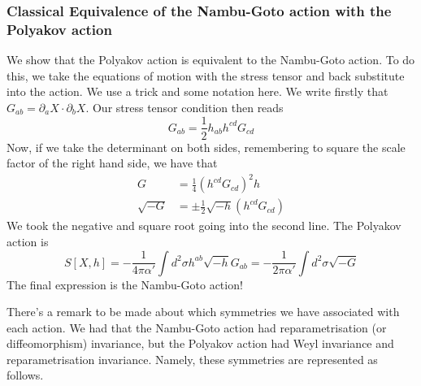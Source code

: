 \documentclass[11pt, oneside]{article}   	%
\theoremstyle{slanted}
\begin{document}
\subsubsection{Classical Equivalence of the 
Nambu-Goto action with the Polyakov action}

We show that the Polyakov action 
is equivalent to the Nambu-Goto action. 
To do this, we take the equations 
of motion with the stress tensor and 
back substitute into the action. We use a 
trick and some notation here. We write 
firstly that $ G_{ ab }  = \partial _ a X \cdot  \partial  _ b X $. 
Our stress tensor condition then reads 
\[
	G _{ ab }   =  \frac{1}{2 } h _{ ab} h ^{ cd } G _{ cd }  
\] Now, if we take the determinant 
on both sides, remembering to square the scale factor 
of the right hand side, 
we have that 
\begin{align*}
	G  & = \frac{1}{4 } \left( h ^{ cd } G _{ cd }   \right)  ^ 2
	h \\ 
	\sqrt{ - G }  &=  \pm \frac{1}{2 } 
	\sqrt{ - h }  \left( h ^{ cd } G _{ cd }  \right)   
\end{align*} We took the negative and square root
going into the second line. The Polyakov action is 
\[
 S\left[  X, h  \right]  
  = - \frac{1}{4 \pi \alpha ' } \int d ^ 2 \sigma h ^{ab  }
  \sqrt{-h }  G _{ ab } = - \frac{1}{2 \pi \alpha '  } \int d ^ 2 \sigma \sqrt{ - G }  
\] The final expression 
is the Nambu-Goto action! 

There's a remark to be made 
about which symmetries we have associated with each action. 
We had that the Nambu-Goto action had reparametrisation (or diffeomorphism) invariance, 
but the Polyakov action had Weyl invariance and reparametrisation invariance. 
Namely, these symmetries are represented as follows. 
\end{document}
